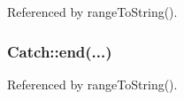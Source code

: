 Referenced by range\-To\-String().

\hypertarget{namespace_catch_a71fef6a57614eb2d9751f8586ff6de6a}{
\subsubsection[{end}]{ Catch\-::end(...)}}\label{namespace_catch_a71fef6a57614eb2d9751f8586ff6de6a}


Referenced by range\-To\-String().

